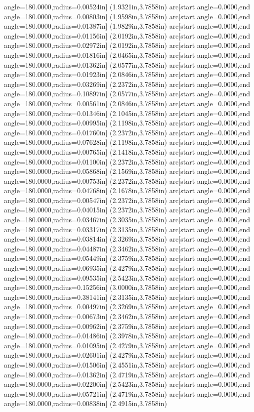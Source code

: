 angle=180.0000,radius=0.00524in] (1.9321in,3.7858in) arc[start angle=0.0000,end angle=180.0000,radius=0.00803in] (1.9598in,3.7858in) arc[start angle=0.0000,end angle=180.0000,radius=0.01387in] (1.9829in,3.7858in) arc[start angle=0.0000,end angle=180.0000,radius=0.01156in] (2.0192in,3.7858in) arc[start angle=0.0000,end angle=180.0000,radius=0.02972in] (2.0192in,3.7858in) arc[start angle=0.0000,end angle=180.0000,radius=0.01816in] (2.0465in,3.7858in) arc[start angle=0.0000,end angle=180.0000,radius=0.01362in] (2.0577in,3.7858in) arc[start angle=0.0000,end angle=180.0000,radius=0.01923in] (2.0846in,3.7858in) arc[start angle=0.0000,end angle=180.0000,radius=0.03269in] (2.2372in,3.7858in) arc[start angle=0.0000,end angle=180.0000,radius=0.10897in] (2.0577in,3.7858in) arc[start angle=0.0000,end angle=180.0000,radius=0.00561in] (2.0846in,3.7858in) arc[start angle=0.0000,end angle=180.0000,radius=0.01346in] (2.1045in,3.7858in) arc[start angle=0.0000,end angle=180.0000,radius=0.00995in] (2.1198in,3.7858in) arc[start angle=0.0000,end angle=180.0000,radius=0.01760in] (2.2372in,3.7858in) arc[start angle=0.0000,end angle=180.0000,radius=0.07628in] (2.1198in,3.7858in) arc[start angle=0.0000,end angle=180.0000,radius=0.00765in] (2.1418in,3.7858in) arc[start angle=0.0000,end angle=180.0000,radius=0.01100in] (2.2372in,3.7858in) arc[start angle=0.0000,end angle=180.0000,radius=0.05868in] (2.1569in,3.7858in) arc[start angle=0.0000,end angle=180.0000,radius=0.00753in] (2.2372in,3.7858in) arc[start angle=0.0000,end angle=180.0000,radius=0.04768in] (2.1678in,3.7858in) arc[start angle=0.0000,end angle=180.0000,radius=0.00547in] (2.2372in,3.7858in) arc[start angle=0.0000,end angle=180.0000,radius=0.04015in] (2.2372in,3.7858in) arc[start angle=0.0000,end angle=180.0000,radius=0.03467in] (2.3035in,3.7858in) arc[start angle=0.0000,end angle=180.0000,radius=0.03317in] (2.3135in,3.7858in) arc[start angle=0.0000,end angle=180.0000,radius=0.03814in] (2.3269in,3.7858in) arc[start angle=0.0000,end angle=180.0000,radius=0.04487in] (2.3462in,3.7858in) arc[start angle=0.0000,end angle=180.0000,radius=0.05449in] (2.3759in,3.7858in) arc[start angle=0.0000,end angle=180.0000,radius=0.06935in] (2.4279in,3.7858in) arc[start angle=0.0000,end angle=180.0000,radius=0.09535in] (2.5423in,3.7858in) arc[start angle=0.0000,end angle=180.0000,radius=0.15256in] (3.0000in,3.7858in) arc[start angle=0.0000,end angle=180.0000,radius=0.38141in] (2.3135in,3.7858in) arc[start angle=0.0000,end angle=180.0000,radius=0.00497in] (2.3269in,3.7858in) arc[start angle=0.0000,end angle=180.0000,radius=0.00673in] (2.3462in,3.7858in) arc[start angle=0.0000,end angle=180.0000,radius=0.00962in] (2.3759in,3.7858in) arc[start angle=0.0000,end angle=180.0000,radius=0.01486in] (2.3978in,3.7858in) arc[start angle=0.0000,end angle=180.0000,radius=0.01095in] (2.4279in,3.7858in) arc[start angle=0.0000,end angle=180.0000,radius=0.02601in] (2.4279in,3.7858in) arc[start angle=0.0000,end angle=180.0000,radius=0.01506in] (2.4551in,3.7858in) arc[start angle=0.0000,end angle=180.0000,radius=0.01362in] (2.4719in,3.7858in) arc[start angle=0.0000,end angle=180.0000,radius=0.02200in] (2.5423in,3.7858in) arc[start angle=0.0000,end angle=180.0000,radius=0.05721in] (2.4719in,3.7858in) arc[start angle=0.0000,end angle=180.0000,radius=0.00838in] (2.4915in,3.7858in) 